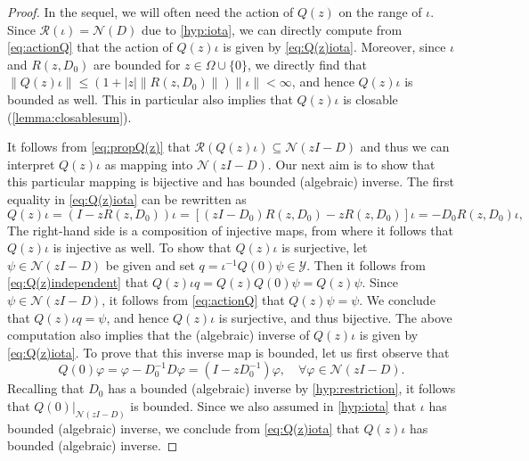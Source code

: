 \documentclass[english]{myarticle}
\begin{document}
\begin{sloppypar}
\begin{proof}
In the sequel, we will often need the action of $Q(z)$ on the range of $\iota$. Since $\mathcal{R}(\iota)= \mathcal{N}(D)$ due to \ref{hyp:iota}, we can directly compute from \eqref{eq:actionQ} that the action of $Q(z)\iota$ is given by \eqref{eq:Q(z)iota}. Moreover, since $\iota$ and $R(z, D_0)$ are bounded for $z \in \Omega \cup \{0\}$, we directly find that $\|Q(z)\iota\| \leq (1+|z| \|R(z,D_0)\|) \| \iota \| < \infty$, and hence $Q(z)\iota$ is bounded as well. This in particular also implies that $Q(z)\iota$ is closable (\cref{lemma:closablesum}).

It follows from \eqref{eq:propQ(z)} that $\mathcal{R}(Q(z)\iota) \subseteq \mathcal{N}(zI-D)$ and thus we can interpret $Q(z)\iota$ as mapping into $\mathcal{N}(zI-D)$. Our next aim is to show that this particular mapping is bijective and has bounded (algebraic) inverse. The first equality in \eqref{eq:Q(z)iota} can be rewritten as
\begin{equation} \label{eq:representationQ(z)iota}
    Q(z)\iota = (I - zR(z,D_0))\iota = [(zI-D_0)R(z,D_0) - zR(z,D_0)]\iota =- D_0 R(z,D_0) \iota,
\end{equation}
The right-hand side is a composition of injective maps, from where it follows that $Q(z)\iota$ is injective as well. To show that $Q(z)\iota$ is surjective, let $\psi \in \mathcal{N}(zI-D)$ be given and set $q = \iota^{-1}Q(0)\psi \in \mathcal{Y}$. Then it follows from \eqref{eq:Q(z)independent} that $Q(z)\iota q = Q(z)Q(0)\psi= Q(z)\psi$. Since $\psi \in \mathcal{N}(zI-D)$, it follows from \eqref{eq:actionQ} that $Q(z) \psi = \psi$. We conclude that $Q(z) \iota q = \psi$, and hence $Q(z) \iota$ is surjective, and thus bijective. The above computation also implies that the (algebraic) inverse of $Q(z) \iota$ is given by \eqref{eq:Q(z)iota}. To prove that this inverse map is bounded, let us first observe that
\begin{equation*}
    Q(0)\varphi = \varphi - D_0^{-1}D\varphi = (I - z D_0^{-1})\varphi, \quad \forall \varphi \in \mathcal{N}(zI-D).
\end{equation*}
Recalling that $D_0$ has a bounded (algebraic) inverse by \ref{hyp:restriction}, it follows that $Q(0)\rvert_{\mathcal{N}(zI-D)}$ is bounded. Since we also assumed in \ref{hyp:iota} that $\iota$ has bounded (algebraic) inverse, we conclude from \eqref{eq:Q(z)iota} that $Q(z) \iota$ has bounded (algebraic) inverse.
\end{proof}


\end{sloppypar}
\end{document}
